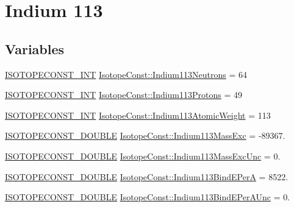 \hypertarget{group___isotope_const-_indium-_in113}{}\section{Indium 113}
\label{group___isotope_const-_indium-_in113}
\subsection*{Variables}
\begin{DoxyCompactItemize}
\item 
\mbox{\hyperlink{group___isotope_const-_macros_ga5f18360b3e99483a35c32d789e62621c}{I\+S\+O\+T\+O\+P\+E\+C\+O\+N\+S\+T\+\_\+\+I\+NT}} \mbox{\hyperlink{group___isotope_const-_indium-_in113_ga489ece1abdcfab0951ca6ba64ebc5abb}{Isotope\+Const\+::\+Indium113\+Neutrons}} = 64
\item 
\mbox{\hyperlink{group___isotope_const-_macros_ga5f18360b3e99483a35c32d789e62621c}{I\+S\+O\+T\+O\+P\+E\+C\+O\+N\+S\+T\+\_\+\+I\+NT}} \mbox{\hyperlink{group___isotope_const-_indium-_in113_ga8d3d4cc1ea44ed55dcb46f1f4edcc850}{Isotope\+Const\+::\+Indium113\+Protons}} = 49
\item 
\mbox{\hyperlink{group___isotope_const-_macros_ga5f18360b3e99483a35c32d789e62621c}{I\+S\+O\+T\+O\+P\+E\+C\+O\+N\+S\+T\+\_\+\+I\+NT}} \mbox{\hyperlink{group___isotope_const-_indium-_in113_ga31d119f6412fbbad698759cf1ffef4f3}{Isotope\+Const\+::\+Indium113\+Atomic\+Weight}} = 113
\item 
\mbox{\hyperlink{group___isotope_const-_macros_ga8f45a7272ce02c0b4c65c44636ed719a}{I\+S\+O\+T\+O\+P\+E\+C\+O\+N\+S\+T\+\_\+\+D\+O\+U\+B\+LE}} \mbox{\hyperlink{group___isotope_const-_indium-_in113_ga9761b9c778cec23b5ffcacc778f26d6d}{Isotope\+Const\+::\+Indium113\+Mass\+Exc}} = -\/89367.
\item 
\mbox{\hyperlink{group___isotope_const-_macros_ga8f45a7272ce02c0b4c65c44636ed719a}{I\+S\+O\+T\+O\+P\+E\+C\+O\+N\+S\+T\+\_\+\+D\+O\+U\+B\+LE}} \mbox{\hyperlink{group___isotope_const-_indium-_in113_ga05c43a0b240f5efff5fc92888e078897}{Isotope\+Const\+::\+Indium113\+Mass\+Exc\+Unc}} = 0.
\item 
\mbox{\hyperlink{group___isotope_const-_macros_ga8f45a7272ce02c0b4c65c44636ed719a}{I\+S\+O\+T\+O\+P\+E\+C\+O\+N\+S\+T\+\_\+\+D\+O\+U\+B\+LE}} \mbox{\hyperlink{group___isotope_const-_indium-_in113_ga31926b503ee61e664258d1f69e379380}{Isotope\+Const\+::\+Indium113\+Bind\+E\+PerA}} = 8522.
\item 
\mbox{\hyperlink{group___isotope_const-_macros_ga8f45a7272ce02c0b4c65c44636ed719a}{I\+S\+O\+T\+O\+P\+E\+C\+O\+N\+S\+T\+\_\+\+D\+O\+U\+B\+LE}} \mbox{\hyperlink{group___isotope_const-_indium-_in113_ga5e4a01dbe6914efebb52f486ca4f4d6b}{Isotope\+Const\+::\+Indium113\+Bind\+E\+Per\+A\+Unc}} = 0.

\end{DoxyCompactItemize}
